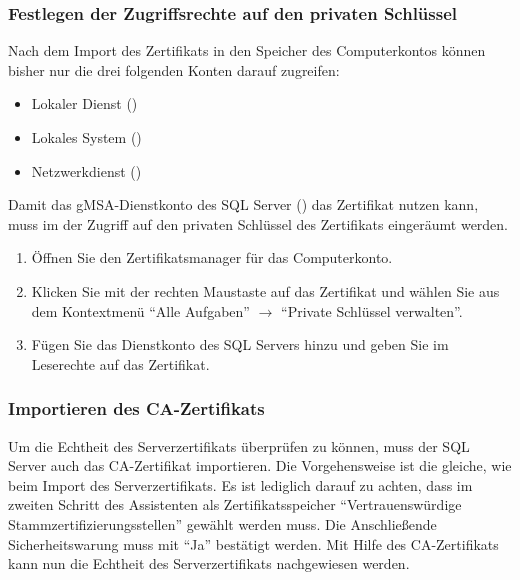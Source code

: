         \subsubsection{Festlegen der Zugriffsrechte auf den privaten Schlüssel}
          Nach dem Import des Zertifikats in den Speicher des Computerkontos
          können bisher nur die drei folgenden Konten darauf zugreifen:
          \begin{itemize}
            \item Lokaler Dienst ()
            \item Lokales System ()
            \item Netzwerkdienst ()
          \end{itemize}
          Damit das gMSA-Dienstkonto des SQL Server
          () das Zertifikat nutzen kann,
          muss im der Zugriff auf den privaten Schlüssel des Zertifikats
          eingeräumt werden.
          \begin{enumerate}
            \item Öffnen Sie den Zertifikatsmanager für das Computerkonto.
            \item Klicken Sie mit der rechten Maustaste auf das Zertifikat und
            wählen Sie aus dem Kontextmenü \enquote{Alle Aufgaben} $\rightarrow$
            \enquote{Private Schlüssel verwalten}.
            \item Fügen Sie das Dienstkonto des SQL Servers hinzu und geben Sie
            im Leserechte auf das Zertifikat.
          \end{enumerate}
        \subsubsection{Importieren des CA-Zertifikats}
          Um die Echtheit des Serverzertifikats überprüfen zu können, muss der
          SQL Server auch das CA-Zertifikat importieren.
          Die Vorgehensweise ist die gleiche, wie beim Import des
          Serverzertifikats. Es ist lediglich darauf zu achten, dass im zweiten
          Schritt des Assistenten als Zertifikatsspeicher
          \enquote{Vertrauenswürdige Stammzertifizierungsstellen} gewählt
          werden muss. Die Anschließende Sicherheitswarung muss mit \enquote{Ja}
          bestätigt werden.
          Mit Hilfe des CA-Zertifikats kann nun die Echtheit des
          Serverzertifikats nachgewiesen werden.
